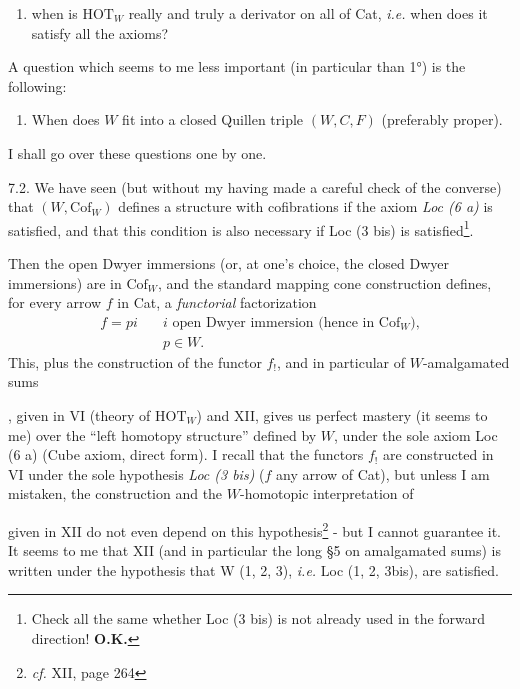 \documentclass[11pt]{article}
\newcommand{\printedpage}[1]{\marginpar{\footnotesize p.~#1}}
\newcommand{\msp}[1]{\marginpar{\footnotesize [#1]}}
\begin{document}
\printedpage{49}

\begin{enumerate}[label=4)]
\item when is $\mathrm{HOT}_W$ really and truly a derivator on all of Cat, \textit{i.e.} when does it satisfy all the axioms?
\end{enumerate}

A question which seems to me less important (in particular than 1°) is the following:

\begin{enumerate}[label=1 bis)]
\item When does $W$ fit into a closed Quillen triple $(W,C,F)$ (preferably proper).
\end{enumerate}

I shall go over these questions one by one.

7.2. We have seen (but without my having made a careful check of the converse) that $(W,\mathrm{Cof}_W)$ defines a structure with cofibrations if the axiom \textit{Loc (6 a)} is satisfied, and that this condition is also necessary if Loc (3 bis) is satisfied\footnote[45]{Check all the same whether Loc (3 bis) is not already used in the forward direction! \textbf{O.K.}}.

\msp{page 99}
Then the open Dwyer immersions (or, at one's choice, the closed Dwyer immersions) are in $\mathrm{Cof}_W$, and the standard mapping cone construction defines, for every arrow $f$ in Cat, a \textit{functorial} factorization
\[
\begin{aligned}
f = pi \quad & i \text{ open Dwyer immersion (hence in } \mathrm{Cof}_W\text{),}\\
& p \in W.
\end{aligned}
\]
This, plus the construction of the functor $f_!$, and in particular of $W$-amalgamated sums
, given in VI (theory of $\mathrm{HOT}_W$) and XII, gives us perfect mastery (it seems to me) over the ``left homotopy structure'' defined by $W$, under the sole axiom Loc (6 a) (Cube axiom, direct form). I recall that the functors $f_!$ are constructed in VI under the sole hypothesis \textit{Loc (3 bis)} ($f$ any arrow of Cat), but unless I am mistaken, the construction
\msp{page 100}
and the $W$-homotopic interpretation of
given in XII do not even depend on this hypothesis\footnote[46]{\textit{cf.} XII, page 264} - but I cannot guarantee it. It seems to me that XII (and in particular the long §5 on amalgamated sums) is written under the hypothesis that W (1, 2, 3), \textit{i.e.} Loc (1, 2, 3bis), are satisfied.
\end{document}
